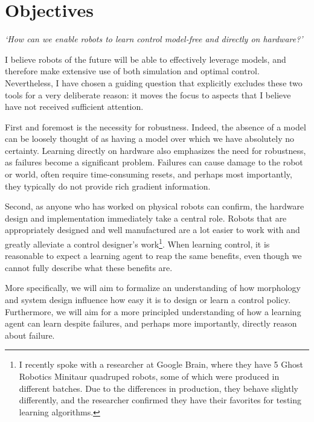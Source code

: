 \section{Objectives}
\emph{`How can we enable robots to learn control model-free and directly on hardware?'} \par
I believe robots of the future will be able to effectively leverage models, and therefore make extensive use of both simulation and optimal control.
Nevertheless, I have chosen a guiding question that explicitly excludes these two tools for a very deliberate reason: it moves the focus to aspects that I believe have not received sufficient attention. \par
First and foremost is the necessity for robustness. Indeed, the absence of a model can be loosely thought of as having a model over which we have absolutely no certainty.
Learning directly on hardware also emphasizes the need for robustness, as failures become a significant problem. Failures can cause damage to the robot or world, often require time-consuming resets, and perhaps most importantly, they typically do not provide rich gradient information. \par
Second, as anyone who has worked on physical robots can confirm, the hardware design and implementation immediately take a central role. Robots that are appropriately designed and well manufactured are a lot easier to work with and greatly alleviate a control designer's work\footnote{I recently spoke with a researcher at Google Brain, where they have 5 Ghost Robotics Minitaur quadruped robots, some of which were produced in different batches. Due to the differences in production, they behave slightly differently, and the researcher confirmed they have their favorites for testing learning algorithms.}. When learning control, it is reasonable to expect a learning agent to reap the same benefits, even though we cannot fully describe what these benefits are. \par

More specifically, we will aim to formalize an understanding of how morphology and system design influence how easy it is to design or learn a control policy. Furthermore, we will aim for a more principled understanding of how a learning agent can learn despite failures, and perhaps more importantly, directly reason about failure.